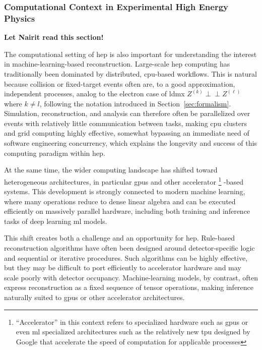 \subsubsection{Computational Context in Experimental High Energy Physics}

\textbf{Let Nairit read this section!}

The computational setting of \gls{hep} is also important for understanding the interest in machine-learning-based reconstruction. Large-scale \gls{hep} computing has traditionally been dominated by distributed, \gls{cpu}-based workflows. \cite{sur2026-heterogeneous-computing} This is natural because collision or fixed-target events often are, to a good approximation, independent processes, analog to the electron case of \gls{ldmx} $Z^{(k)} \perp\!\!\!\perp Z^{(\ell)}$ where $k \neq l$, following the notation introduced in Section~\ref{sec:formalism}. Simulation, reconstruction, and analysis can therefore often be parallelized over events with relatively little communication between tasks, making \gls{cpu} clusters and grid computing highly effective, somewhat bypassing an immediate need of software engineering concurrency, which explains the longevity and success of this computing paradigm within \gls{hep}.

At the same time, the wider computing landscape has shifted toward heterogeneous architectures, in particular \glspl{gpu} and other accelerator \footnote{``Accelerator'' in this context refers to specialized hardware such as \glspl{gpu} or even \gls{ml} specialized architectures such as the relatively new \gls{tpu} designed by Google that accelerate the speed of computation for applicable processes\cite{needed}}
-based systems. This development is strongly connected to modern machine learning, where many operations reduce to dense linear algebra and can be executed efficiently on massively parallel hardware, including both training and inference tasks of deep learning \gls{ml} models.

This shift creates both a challenge and an opportunity for \gls{hep}. Rule-based reconstruction algorithms have often been designed around detector-specific logic and sequential or iterative procedures. Such algorithms can be highly effective, but they may be difficult to port efficiently to accelerator hardware and may scale poorly with detector occupancy. Machine-learning models, by contrast, often express reconstruction as a fixed sequence of tensor operations, making inference naturally suited to \glspl{gpu} or other accelerator architectures. 

